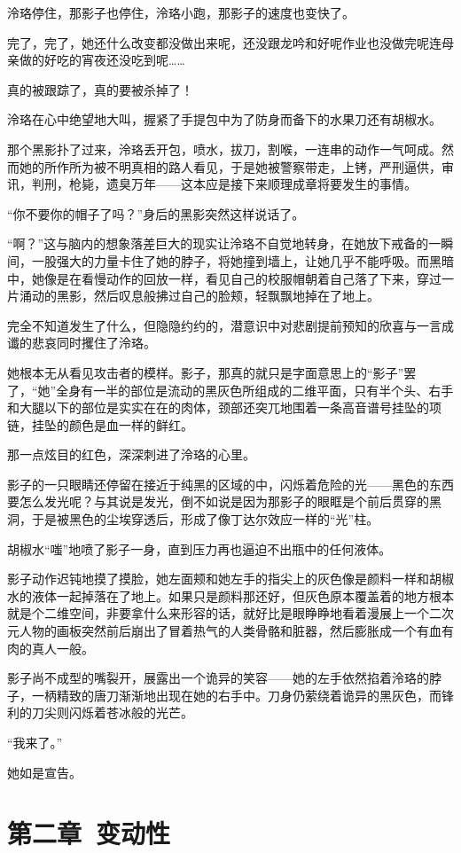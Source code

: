 \documentclass[UTF8, scheme = chinese, openany]{ctexbook}
\begin{document}
泠珞停住，那影子也停住，泠珞小跑，那影子的速度也变快了。

完了，完了，她还什么改变都没做出来呢，还没跟龙吟和好呢作业也没做完呢连母亲做的好吃的宵夜还没吃到呢……

真的被跟踪了，真的要被杀掉了！

泠珞在心中绝望地大叫，握紧了手提包中为了防身而备下的水果刀还有胡椒水。

那个黑影扑了过来，泠珞丢开包，喷水，拔刀，割喉，一连串的动作一气呵成。然而她的所作所为被不明真相的路人看见，于是她被警察带走，上铐，严刑逼供，审讯，判刑，枪毙，遗臭万年——这本应是接下来顺理成章将要发生的事情。

“你不要你的帽子了吗？”身后的黑影突然这样说话了。

“啊？”这与脑内的想象落差巨大的现实让泠珞不自觉地转身，在她放下戒备的一瞬间，一股强大的力量卡住了她的脖子，将她撞到墙上，让她几乎不能呼吸。而黑暗中，她像是在看慢动作的回放一样，看见自己的校服帽朝着自己落了下来，穿过一片涌动的黑影，然后叹息般拂过自己的脸颊，轻飘飘地掉在了地上。

完全不知道发生了什么，但隐隐约约的，潜意识中对悲剧提前预知的欣喜与一言成谶的悲哀同时攫住了泠珞。

她根本无从看见攻击者的模样。影子，那真的就只是字面意思上的“影子”罢了，“她”全身有一半的部位是流动的黑灰色所组成的二维平面，只有半个头、右手和大腿以下的部位是实实在在的肉体，颈部还突兀地围着一条高音谱号挂坠的项链，挂坠的颜色是血一样的鲜红。

那一点炫目的红色，深深刺进了泠珞的心里。

影子的一只眼睛还停留在接近于纯黑的区域的中，闪烁着危险的光——黑色的东西要怎么发光呢？与其说是发光，倒不如说是因为那影子的眼眶是个前后贯穿的黑洞，于是被黑色的尘埃穿透后，形成了像丁达尔效应一样的“光”柱。

胡椒水“嗤”地喷了影子一身，直到压力再也逼迫不出瓶中的任何液体。

影子动作迟钝地摸了摸脸，她左面颊和她左手的指尖上的灰色像是颜料一样和胡椒水的液体一起掉落在了地上。如果只是颜料那还好，但灰色原本覆盖着的地方根本就是个二维空间，非要拿什么来形容的话，就好比是眼睁睁地看着漫展上一个二次元人物的画板突然前后崩出了冒着热气的人类骨骼和脏器，然后膨胀成一个有血有肉的真人一般。

影子尚不成型的嘴裂开，展露出一个诡异的笑容——她的左手依然掐着泠珞的脖子，一柄精致的唐刀渐渐地出现在她的右手中。刀身仍萦绕着诡异的黑灰色，而锋利的刀尖则闪烁着苍冰般的光芒。

“我来了。”

她如是宣告。

\chapter{第二章\ 变动性} 
\end{document}
